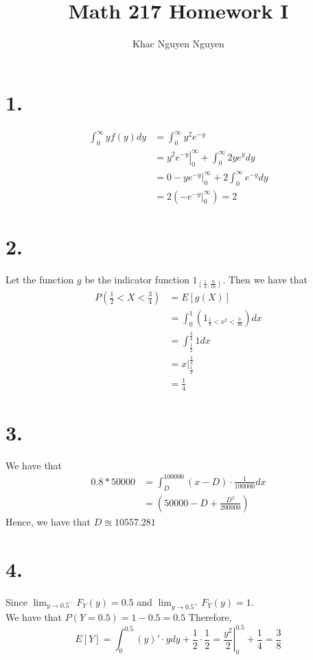 \documentclass[11pt]{article}
\title{\textbf{Math 217 Homework I}}
\author{Khac Nguyen Nguyen}
\date{}
\begin{document}
\section*{1.}
\begin{equation*}
    \begin{aligned}
        \int_0^\infty yf(y) dy 
        &= \int_0^\infty y^2e^{-y} \\
        &= \left.y^2e^{-y} \right|^\infty_0 + \int_0^\infty 2ye^y dy \\
        &= 0 - \left.ye^{-y}\right|^\infty_0 + 2\int_0^\infty e^{-y}dy \\
        &= 2\left(-e^{-y}|_0^\infty\right) = 2
    \end{aligned}
\end{equation*}
\pagebreak
\section*{2.}
Let the function $g$ be the indicator function $1_{\left(\frac{1}{4}, \frac{9}{16}\right)}$.
Then we have that 
\begin{equation*}
    \begin{aligned}
        P\left(\frac{1}{2} < X < \frac{3}{4}\right) &= E[g(X)] \\
        &= \int_{0}^{1}\left(1_{\frac{1}{4}<x^{2}<\frac{9}{16}}\right)dx \\ 
        &=\int_{\frac{1}{2}}^{\frac{3}{4}}1 dx \\
        &= x|_\frac{1}{2}^\frac{3}{4} \\
        &= \frac{1}{4}
    \end{aligned}
\end{equation*}
\pagebreak
\section*{3.}
We have that
\begin{equation*}
    \begin{aligned}
        0.8*50000 
        &= \int_D^{100000} (x-D) \cdot \frac{1}{100000} dx \\
        &= \left(50000 - D + \frac{D^2}{200000}\right)
    \end{aligned}
\end{equation*}
Hence,  we have that $D \approxeq 10557.281$
\pagebreak
\section*{4.}
Since $\lim_{y\to 0.5^-} F_Y(y) = 0.5$ and $\lim_{y\to 0.5^+} F_Y(y) = 1$. \\ 
We have that $P(Y=0.5) = 1-0.5 = 0.5$
Therefore, 
\[
    E[Y] = \int_0^{0.5} (y)' \cdot y dy + \frac{1}{2} \cdot \frac{1}{2} 
    = \left.\frac{y^2}{2} \right|_0^{0.5} + \frac{1}{4} 
    = \frac{3}{8}
\]
\end{document}
